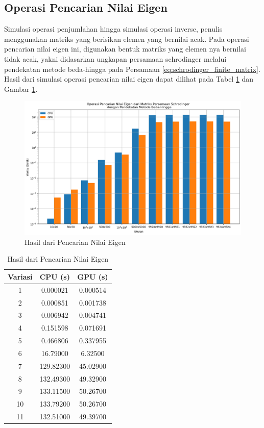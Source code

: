 \subsection{Operasi Pencarian Nilai Eigen}

Simulasi operasi penjumlahan hingga simulasi operasi inverse, penulis menggunakan matriks yang berisikan elemen yang bernilai acak. Pada operasi pencarian nilai eigen ini, digunakan bentuk matriks yang elemen nya bernilai tidak acak, yakni didasarkan ungkapan persamaan schrodinger melalui pendekatan metode beda-hingga pada Persamaan \ref{eq:schrodinger_finite_matrix}. Hasil dari simulasi operasi pencarian nilai eigen dapat dilihat pada Tabel \ref{tab:result_eigenvalue_schrodinger} dan Gambar \ref{img:result_eigenvalue_schrodinger}.

\begin{figure}[H]
	\centering
	\includegraphics[width=14cm, scale=1]{images/penelitian/eigenvalue-schrodinger.png}
	\caption{Hasil dari Pencarian Nilai Eigen}
	\label{img:result_eigenvalue_schrodinger}
\end{figure}

\begin{table}[H]
	\centering
	\caption{Hasil dari Pencarian Nilai Eigen}
	\label{tab:result_eigenvalue_schrodinger}
	\begin{tabular}{ccc}
		\toprule
		Variasi & CPU (s)   & GPU (s)  \\
		\midrule
		1       & 0.000021  & 0.000514 \\
		2       & 0.000851  & 0.001738 \\
		3       & 0.006942  & 0.004741 \\
		4       & 0.151598  & 0.071691 \\
		5       & 0.466806  & 0.337955 \\
		6       & 16.79000  & 6.32500  \\
		7       & 129.82300 & 45.02900 \\
		8       & 132.49300 & 49.32900 \\
		9       & 133.11500 & 50.26700 \\
		10      & 133.79200 & 50.26700 \\
		11      & 132.51000 & 49.39700 \\
		\bottomrule
	\end{tabular}
\end{table}

